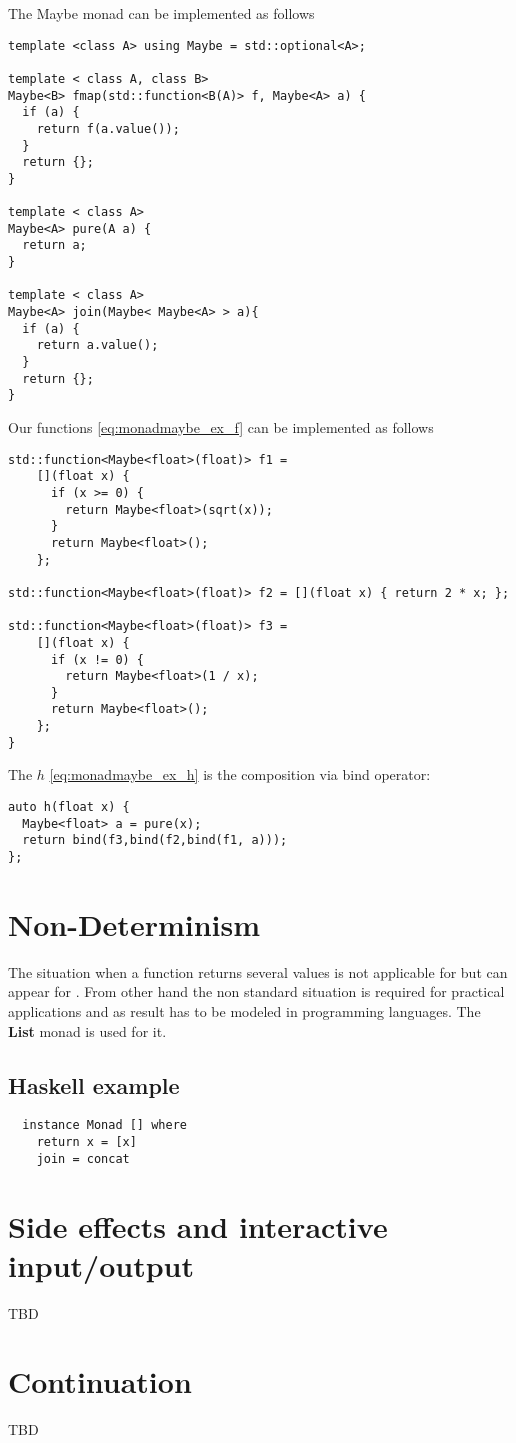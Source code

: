 \begin{example}
\label{ex:maybe_monad_cpp}
The Maybe monad can be implemented as follows
\begin{verbatim}
template <class A> using Maybe = std::optional<A>;

template < class A, class B> 
Maybe<B> fmap(std::function<B(A)> f, Maybe<A> a) {
  if (a) {
    return f(a.value());
  }
  return {};
}

template < class A> 
Maybe<A> pure(A a) {
  return a;
}

template < class A> 
Maybe<A> join(Maybe< Maybe<A> > a){
  if (a) {
    return a.value();
  }
  return {};
}
\end{verbatim} 

Our functions \eqref{eq:monadmaybe_ex_f} can be implemented as follows
\begin{verbatim}
std::function<Maybe<float>(float)> f1 =
    [](float x) {
      if (x >= 0) {
        return Maybe<float>(sqrt(x));
      }
      return Maybe<float>();
    };

std::function<Maybe<float>(float)> f2 = [](float x) { return 2 * x; };

std::function<Maybe<float>(float)> f3 =
    [](float x) {
      if (x != 0) {
        return Maybe<float>(1 / x);
      }
      return Maybe<float>();
    };
}
\end{verbatim}

The $h$ \eqref{eq:monadmaybe_ex_h} is the composition via bind
operator:
\begin{verbatim}
auto h(float x) {
  Maybe<float> a = pure(x);
  return bind(f3,bind(f2,bind(f1, a)));
};
\end{verbatim}

\end{example}

\section{Non-Determinism}

The situation when a function returns several values is not applicable
for  but can appear for
. From other hand the non standard
situation is required for practical applications and as result has to
be modeled in programming languages. The \textbf{List} monad is used
for it.

\subsection{Haskell example}

\begin{example}
\label{ex:list_monad_haskell}
\begin{verbatim}
  instance Monad [] where
    return x = [x]
    join = concat
\end{verbatim}
\end{example}

\section{Side effects and interactive input/output}

TBD

\section{Continuation}

TBD

